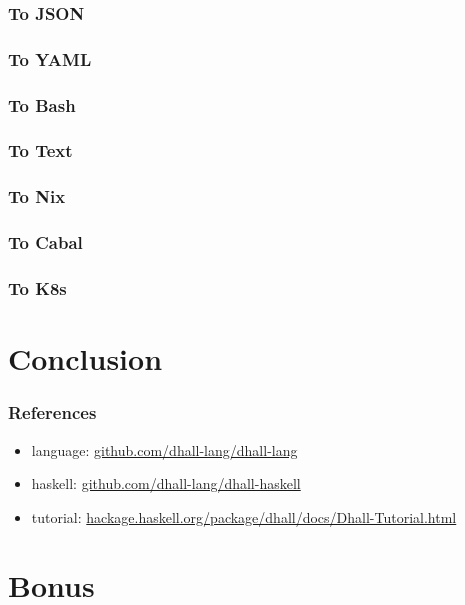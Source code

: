 \documentclass{beamer}
\begin{document}
\begin{frame}
  \frametitle{To JSON}
\end{frame}

\begin{frame}
  \frametitle{To YAML}
\end{frame}

\begin{frame}
  \frametitle{To Bash}
\end{frame}

\begin{frame}
  \frametitle{To Text}
\end{frame}

\begin{frame}
  \frametitle{To Nix}
\end{frame}

\begin{frame}
  \frametitle{To Cabal}
\end{frame}

\begin{frame}
  \frametitle{To K8s}
\end{frame}

\section{Conclusion}

\begin{frame}
  \frametitle{References}
  \begin{itemize}
  \item language: \url{github.com/dhall-lang/dhall-lang}
  \item haskell: \url{github.com/dhall-lang/dhall-haskell}
  \item tutorial: \url{hackage.haskell.org/package/dhall/docs/Dhall-Tutorial.html}
  \end{itemize}
\end{frame}

\appendix{}

\section*{Bonus}\label{sec:bonus}
\end{document}
